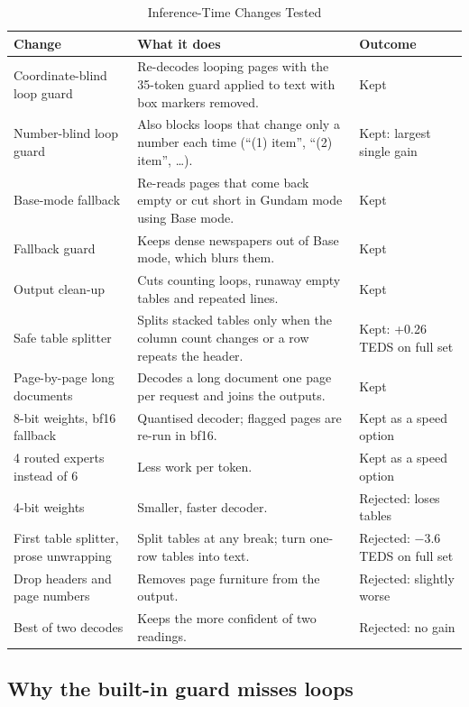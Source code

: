 \documentclass[journal]{IEEEtran}
\begin{document}
\begin{table}[!t]
\caption{Inference-Time Changes Tested}
\label{tab:changes}
\centering
\footnotesize
\begin{tabular}{@{}p{3.9cm}p{8.7cm}p{4.2cm}@{}}
\toprule
Change & What it does & Outcome \\
\midrule
Coordinate-blind loop guard & Re-decodes looping pages with the 35-token guard applied to text with box markers removed. & Kept \\
Number-blind loop guard & Also blocks loops that change only a number each time (``(1) item'', ``(2) item'', \dots). & Kept: largest single gain \\
Base-mode fallback & Re-reads pages that come back empty or cut short in Gundam mode using Base mode. & Kept \\
Fallback guard & Keeps dense newspapers out of Base mode, which blurs them. & Kept \\
Output clean-up & Cuts counting loops, runaway empty tables and repeated lines. & Kept \\
Safe table splitter & Splits stacked tables only when the column count changes or a row repeats the header. & Kept: +0.26 TEDS on full set \\
Page-by-page long documents & Decodes a long document one page per request and joins the outputs. & Kept \\
8-bit weights, bf16 fallback & Quantised decoder; flagged pages are re-run in bf16. & Kept as a speed option \\
4 routed experts instead of 6 & Less work per token. & Kept as a speed option \\
4-bit weights & Smaller, faster decoder. & Rejected: loses tables \\
First table splitter, prose unwrapping & Split tables at any break; turn one-row tables into text. & Rejected: $-3.6$ TEDS on full set \\
Drop headers and page numbers & Removes page furniture from the output. & Rejected: slightly worse \\
Best of two decodes & Keeps the more confident of two readings. & Rejected: no gain \\
\bottomrule
\end{tabular}
\end{table}

\subsection{Why the built-in guard misses loops}
\end{document}
